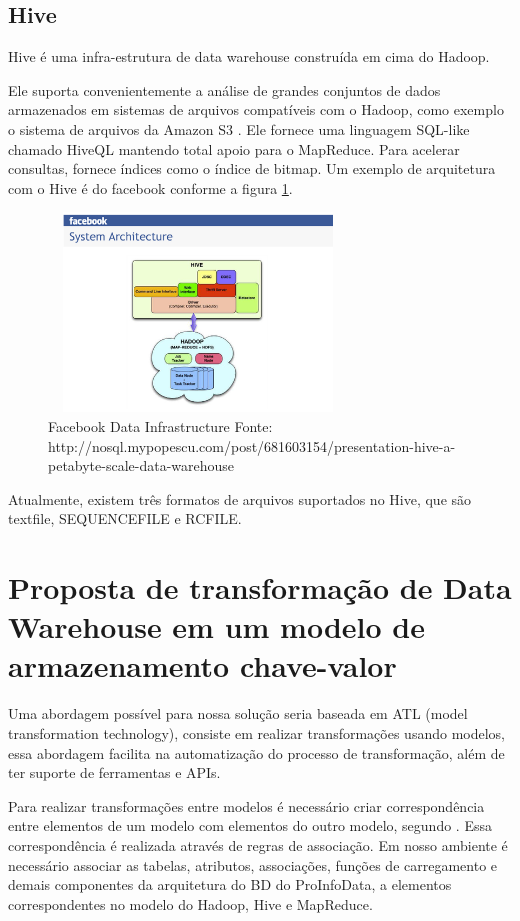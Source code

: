 \documentclass[a4paper,12pt]{article}
\begin{document}
\subsection{\textbf{Hive}}
Hive \cite{hive} é uma infra-estrutura de data warehouse construída em cima do
Hadoop. 

Ele suporta convenientemente a análise de grandes conjuntos de dados armazenados
em sistemas de arquivos compatíveis com o Hadoop,  como exemplo o sistema de
arquivos  da Amazon S3 \cite{amazon}. Ele fornece uma linguagem SQL-like chamado HiveQL
mantendo total apoio para o MapReduce. Para acelerar consultas, fornece índices
como o índice de bitmap. Um exemplo de arquitetura com o Hive é do facebook
conforme a figura \ref{hive}.

\begin{figure}[ht]
  \centering
  \includegraphics[width=300px,height=200px]{img/hive2.png}
  \caption{Facebook Data Infrastructure\newline
  Fonte: http://nosql.mypopescu.com/post/681603154/presentation-hive-a-petabyte-scale-data-warehouse}
  \label{hive}
\end{figure}
 
Atualmente, existem três formatos de arquivos suportados no Hive, que são
textfile, SEQUENCEFILE e RCFILE.


\section{\textbf{Proposta de transformação de Data Warehouse em um modelo 
            de armazenamento chave-valor}}

Uma abordagem possível para nossa solução seria baseada em ATL (model
transformation technology), consiste em realizar transformações usando modelos,
essa abordagem facilita na automatização do processo de transformação, além de
ter suporte de ferramentas e APIs.

Para realizar transformações entre modelos é necessário criar correspondência
entre elementos de um modelo com elementos do outro modelo, segundo \cite{Didonet}.
Essa correspondência é realizada através de regras de associação. Em nosso
ambiente é necessário associar as tabelas, atributos, associações, funções de
carregamento e demais componentes da arquitetura do BD do ProInfoData, a
elementos correspondentes no modelo do Hadoop, Hive e MapReduce.
\end{document}

